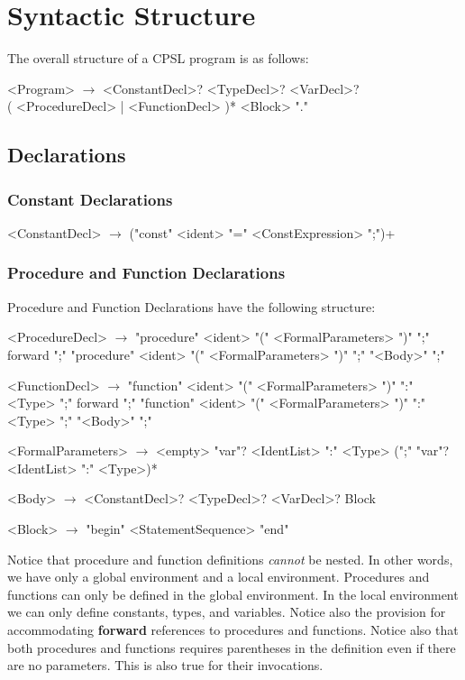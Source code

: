\documentclass{book}
\begin{document}
\chapter{Syntactic Structure}
The overall structure of a CPSL program is as follows:
\begin{grammar}
<Program> $\rightarrow$ <ConstantDecl>? <TypeDecl>? <VarDecl>? \\
( <ProcedureDecl> | <FunctionDecl> )* <Block> "."
\end{grammar}

\section{Declarations}

\subsection{Constant Declarations}
\begin{grammar}
<ConstantDecl> $\rightarrow$ ("const" <ident> "=" <ConstExpression> ";")+
\end{grammar}

\subsection{Procedure and Function Declarations}
Procedure and Function Declarations have the following structure:
\begin{grammar}
<ProcedureDecl>  $\rightarrow$ 
"procedure" <ident> "(" <FormalParameters> ")" ";" forward ";"
\alt "procedure" <ident> "(" <FormalParameters> ")" ";" "<Body>" ";"

<FunctionDecl>  $\rightarrow$ 
"function" <ident> "(" <FormalParameters> ")" ":" <Type> ";" forward ";"
\alt "function" <ident> "(" <FormalParameters> ")" ":" <Type>  ";" "<Body>" ";"

<FormalParameters> $\rightarrow$ <empty>
\alt "var"? <IdentList> ":" <Type> (";" "var"? <IdentList> ":" <Type>)*

<Body> $\rightarrow$ <ConstantDecl>? <TypeDecl>? <VarDecl>? Block

<Block> $\rightarrow$ "begin" <StatementSequence> "end"
\end{grammar}

Notice that procedure and function definitions \textit{cannot} be nested.  In other words, we have only a global environment and a local environment.  Procedures and functions can only be defined in the global environment.  In the local environment we can only define constants, types, and variables.  Notice also the provision for accommodating \textbf{forward} references to procedures and functions.  Notice also that both procedures and functions requires parentheses in the definition even if there are no parameters.  This is also true for their invocations.
\end{document}
